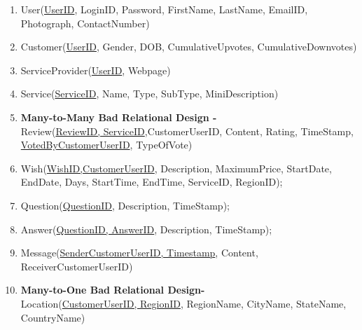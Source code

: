 \documentclass[a4paper]{article}
\begin{document}
\begin{enumerate}

\item User(\underline{UserID}, LoginID, Password, FirstName, LastName, EmailID, Photograph, ContactNumber)

\item Customer(\underline{UserID}, Gender, DOB, CumulativeUpvotes, CumulativeDownvotes)

\item ServiceProvider(\underline{UserID}, Webpage)

\item Service(\underline{ServiceID}, Name, Type, SubType, MiniDescription)

\item  \textbf{Many-to-Many Bad Relational Design -}\\  Review(\underline{ReviewID, ServiceID},CustomerUserID, Content, Rating, TimeStamp, \underline{VotedByCustomerUserID}, TypeOfVote)

\item Wish(\underline{WishID,CustomerUserID}, Description, MaximumPrice, StartDate, EndDate, Days, StartTime, EndTime, ServiceID, RegionID);

\item Question(\underline{QuestionID}, Description, TimeStamp);

\item Answer(\underline{QuestionID, AnswerID}, Description, TimeStamp);

\item Message(\underline {SenderCustomerUserID, Timestamp}, Content, ReceiverCustomerUserID)

\item \textbf{Many-to-One Bad Relational Design- } \\ Location(\underline{CustomerUserID, RegionID}, RegionName, CityName, StateName, CountryName) 
\end{enumerate}
\end{document}
